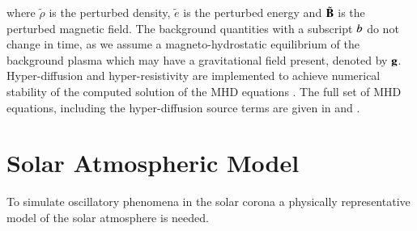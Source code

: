\documentclass[preprint,authoryear,12pt]{elsarticle}
\begin{document}
where $\tilde{\rho}$ is the  perturbed density,  $\tilde{e}$ is the perturbed energy and $\tilde{\bf B}$  is the perturbed magnetic field. The background quantities with a subscript $\it{b}$ do not change in time, as we assume a magneto-hydrostatic equilibrium of the background plasma which may have a gravitational field present, denoted by $\bf g$. Hyper-diffusion and hyper-resistivity are implemented to achieve numerical stability of the computed solution of the MHD equations \citep[see for example][]{Caunt2001}.  The full set of MHD equations, including the hyper-diffusion source terms are given in \citet{Griffiths2015} and \citet{Shelyag2008}.

\section{Solar Atmospheric Model}
To simulate oscillatory phenomena in the solar corona a physically representative model of the solar atmosphere is needed. 
\end{document}
